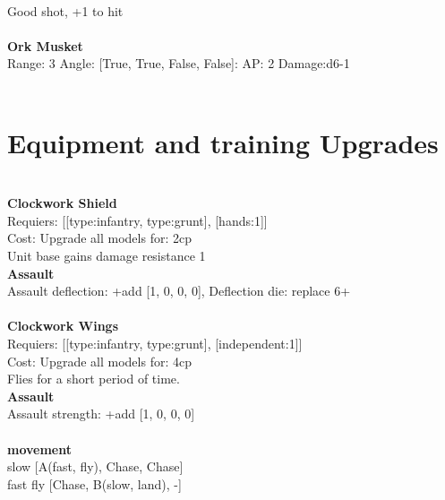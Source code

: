 \ \\
Good shot, +1 to hit\\ 

\ \\
{\bf Ork Musket } \\



Range: 3  Angle: [True, True, False, False]: AP: 2 Damage:d6-1 \\




 
\ \\

\section{Equipment and training Upgrades}\ \\
{\bf Clockwork Shield } \\

Requiers: [[type:infantry, type:grunt], [hands:1]] \\
Cost: Upgrade all models for: 2cp \\
Unit base gains damage resistance 1\\ 




{\bf Assault} \ \\
Assault deflection: +add [1, 0, 0, 0], Deflection die: replace 6+
\\ 




\ \\
{\bf Clockwork Wings } \\

Requiers: [[type:infantry, type:grunt], [independent:1]] \\
Cost: Upgrade all models for: 4cp \\
Flies for a short period of time.\\ 




{\bf Assault} \ \\
Assault strength: +add [1, 0, 0, 0] 
\\ 



\ \\ {\bf movement } \\
slow [A(fast, fly), Chase, Chase] \\
fast fly [Chase, B(slow, land), -] \\

